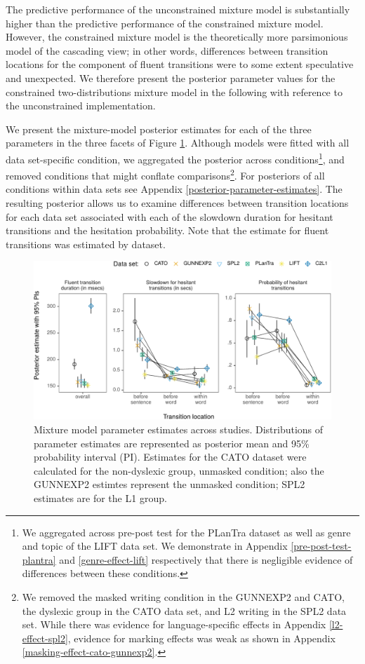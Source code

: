\documentclass[
  english,
  man,floatsintext]{apa7}
\begin{document}
The predictive performance of the unconstrained mixture model is substantially higher than the predictive performance of the constrained mixture model. However, the constrained mixture model is the theoretically more parsimonious model of the cascading view; in other words, differences between transition locations for the component of fluent transitions were to some extent speculative and unexpected. We therefore present the posterior parameter values for the constrained two-distributions mixture model in the following with reference to the unconstrained implementation.

We present the mixture-model posterior estimates for each of the three parameters in the three facets of Figure \ref{fig:crossstudypost2}. Although models were fitted with all data set-specific condition, we aggregated the posterior across conditions\footnote{We aggregated across pre-post test for the PLanTra dataset as well as genre and topic of the LIFT data set. We demonstrate in Appendix \ref{pre-post-test-plantra} and \ref{genre-effect-lift} respectively that there is negligible evidence of differences between these conditions.}, and removed conditions that might conflate comparisons\footnote{We removed the masked writing condition in the GUNNEXP2 and CATO, the dyslexic group in the CATO data set, and L2 writing in the SPL2 data set. While there was evidence for language-specific effects in Appendix \ref{l2-effect-spl2}, evidence for marking effects was weak as shown in Appendix \ref{masking-effect-cato-gunnexp2}.}. For posteriors of all conditions within data sets see Appendix \ref{posterior-parameter-estimates}. The resulting posterior allows us to examine differences between transition locations for each data set associated with each of the slowdown duration for hesitant transitions and the hesitation probability. Note that the estimate for fluent transitions was estimated by dataset.

\begin{figure}

{\centering \includegraphics{manuscript_files/figure-latex/crossstudypost2-1} 

}

\caption{Mixture model parameter estimates across studies. Distributions of parameter estimates are represented as posterior mean and 95\% probability interval (PI). Estimates for the CATO dataset were calculated for the non-dyslexic group, unmasked condition; also the GUNNEXP2 estimtes represent the unmasked condition; SPL2 estimates are for the L1 group.}\label{fig:crossstudypost2}
\end{figure}
\end{document}
